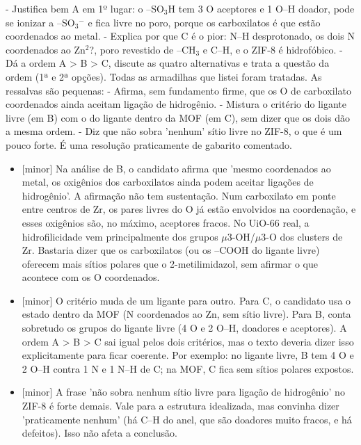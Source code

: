 \documentclass{article}%
\begin{document}
{-} Justifica bem A em 1º lugar: o --SO$_{3}$H tem 3 O aceptores e 1 O--H doador, pode se ionizar a --SO$_{3}$$^{-}$ e fica livre no poro, porque os carboxilatos é que estão coordenados ao metal.\newline%
{-} Explica por que C é o pior: N--H desprotonado, os dois N coordenados ao Zn$^2$?, poro revestido de --CH$_{3}$ e C--H, e o ZIF{-}8 é hidrofóbico.\newline%
{-} Dá a ordem A > B > C, discute as quatro alternativas e trata a questão da ordem (1ª e 2ª opções).\newline%
\newline%
Todas as armadilhas que listei foram tratadas.\newline%
\newline%
As ressalvas são pequenas:\newline%
{-} Afirma, sem fundamento firme, que os O de carboxilato coordenados ainda aceitam ligação de hidrogênio.\newline%
{-} Mistura o critério do ligante livre (em B) com o do ligante dentro da MOF (em C), sem dizer que os dois dão a mesma ordem.\newline%
{-} Diz que não sobra 'nenhum' sítio livre no ZIF{-}8, o que é um pouco forte.\newline%
\newline%
É uma resolução praticamente de gabarito comentado.%
\begin{itemize}%
\item%
{[}minor{]} Na análise de B, o candidato afirma que 'mesmo coordenados ao metal, os oxigênios dos carboxilatos ainda podem aceitar ligações de hidrogênio'. A afirmação não tem sustentação. Num carboxilato em ponte entre centros de Zr, os pares livres do O já estão envolvidos na coordenação, e esses oxigênios são, no máximo, aceptores fracos. No UiO{-}66 real, a hidrofilicidade vem principalmente dos grupos $\mu$3{-}OH/$\mu$3{-}O dos clusters de Zr. Bastaria dizer que os carboxilatos (ou os --COOH do ligante livre) oferecem mais sítios polares que o 2{-}metilimidazol, sem afirmar o que acontece com os O coordenados.%
\item%
{[}minor{]} O critério muda de um ligante para outro. Para C, o candidato usa o estado dentro da MOF (N coordenados ao Zn, sem sítio livre). Para B, conta sobretudo os grupos do ligante livre (4 O e 2 O--H, doadores e aceptores). A ordem A > B > C sai igual pelos dois critérios, mas o texto deveria dizer isso explicitamente para ficar coerente. Por exemplo: no ligante livre, B tem 4 O e 2 O--H contra 1 N e 1 N--H de C; na MOF, C fica sem sítios polares expostos.%
\item%
{[}minor{]} A frase 'não sobra nenhum sítio livre para ligação de hidrogênio' no ZIF{-}8 é forte demais. Vale para a estrutura idealizada, mas convinha dizer 'praticamente nenhum' (há C--H do anel, que são doadores muito fracos, e há defeitos). Isso não afeta a conclusão.%
\end{itemize}%
\end{document}
